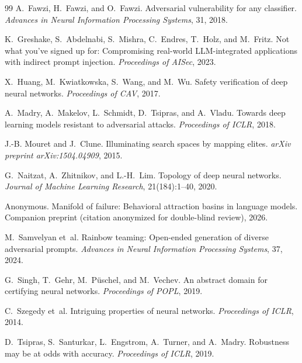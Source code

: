 \documentclass[11pt]{article}
\begin{document}
\begin{thebibliography}{99}
A.~Fawzi, H.~Fawzi, and O.~Fawzi.
\newblock Adversarial vulnerability for any classifier.
\newblock \emph{Advances in Neural Information Processing Systems}, 31, 2018.

K.~Greshake, S.~Abdelnabi, S.~Mishra, C.~Endres, T.~Holz, and M.~Fritz.
\newblock Not what you've signed up for: Compromising real-world
  {LLM}-integrated applications with indirect prompt injection.
\newblock \emph{Proceedings of AISec}, 2023.

X.~Huang, M.~Kwiatkowska, S.~Wang, and M.~Wu.
\newblock Safety verification of deep neural networks.
\newblock \emph{Proceedings of CAV}, 2017.

A.~Madry, A.~Makelov, L.~Schmidt, D.~Tsipras, and A.~Vladu.
\newblock Towards deep learning models resistant to adversarial attacks.
\newblock \emph{Proceedings of ICLR}, 2018.

J.-B. Mouret and J.~Clune.
\newblock Illuminating search spaces by mapping elites.
\newblock \emph{arXiv preprint arXiv:1504.04909}, 2015.

G.~Naitzat, A.~Zhitnikov, and L.-H.~Lim.
\newblock Topology of deep neural networks.
\newblock \emph{Journal of Machine Learning Research}, 21(184):1--40, 2020.

Anonymous.
\newblock Manifold of failure: Behavioral attraction basins in language
  models.
\newblock Companion preprint (citation anonymized for double-blind
  review), 2026.

M.~Samvelyan et~al.
\newblock Rainbow teaming: Open-ended generation of diverse adversarial
  prompts.
\newblock \emph{Advances in Neural Information Processing Systems}, 37,
2024.

G.~Singh, T.~Gehr, M.~P{\"u}schel, and M.~Vechev.
\newblock An abstract domain for certifying neural networks.
\newblock \emph{Proceedings of POPL}, 2019.

C.~Szegedy et~al.
\newblock Intriguing properties of neural networks.
\newblock \emph{Proceedings of ICLR}, 2014.

D.~Tsipras, S.~Santurkar, L.~Engstrom, A.~Turner, and A.~Madry.
\newblock Robustness may be at odds with accuracy.
\newblock \emph{Proceedings of ICLR}, 2019.


\end{thebibliography}
\end{document}
